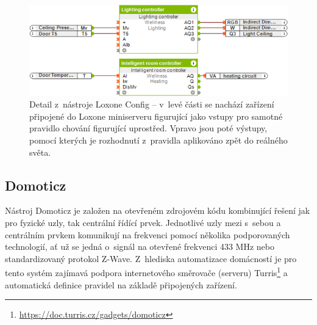 \begin{figure}%
    \centering
    \includegraphics[width=.75\textwidth]{figures/iot-loxone-config.png}
    \caption{Detail z~nástroje Loxone Config -- v~levé části se nachází zařízení připojené do Loxone miniserveru
    figurující jako vstupy pro samotné pravidlo chování figurující uprostřed.
    Vpravo jsou poté výstupy, pomocí kterých je rozhodnutí z~pravidla aplikováno zpět do reálného světa\protect\footnotemark.}
    \label{fig:iot-loxone-config}
\end{figure}

\subsection{Domoticz}\label{subsec:domoticz}
Nástroj Domoticz je založen na otevřeném zdrojovém kódu kombinující řešení jak pro fyzické uzly, tak centrální řídící
prvek.
Jednotlivé uzly mezi s~sebou a centrálním prvkem komunikují na frekvenci pomocí několika podporovaných technologií,
ať už se jedná o~signál na otevřené frekvenci 433 MHz nebo standardizovaný protokol Z-Wave.
Z~hlediska automatizace domácností je pro tento systém zajímavá podpora internetového směrovače (serveru)
Turris\footnote{\url{https://doc.turris.cz/gadgets/domoticz}} a automatická definice pravidel na základě připojených zařízení.

